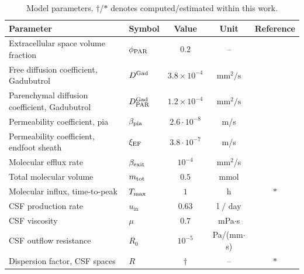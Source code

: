 \documentclass[fleqn,10pt]{wlscirep}
\begin{document}
\begin{table}
  \begin{center}
    \begin{tabular}{ll|ccc}
      \toprule
      Parameter& Symbol & Value & Unit& Reference\\
      \midrule
      Extracellular space volume fraction & $\phi_{\rm PAR}$ & 0.2 & -- & \cite{nicholson1981ion} \\
      Free diffusion coefficient, Gadubutrol & $D^{\rm Gad}$ & $3.8 \times 10^{-4}$& $\text{mm}^2/\text{s}$ & \cite{valnes2020apparent}\\
      Parenchymal diffusion coefficient, Gadubutrol & $D^{\rm Gad}_{\rm PAR}$ & $1.2 \times 10^{-4}$ & $\text{mm}^2/\text{s}$  & \cite{hornkjol2022csf} \\
      Permeability coefficient, pia & $\beta_{\rm pia}$ & $2.6 \cdot 10^{-8}$ & m/s & \cite{riseth2025twocompartment} \\
      Permeability coefficient, endfoot sheath & $\xi_{\rm EF}$ & $3.8\cdot 10^{-7}$  & m/s & \cite{koch2023estimates} \\
      Molecular efflux rate & $\beta_{\rm exit}$ & $10^{-4}$ & mm$^2$/s & \cite{hornkjol2022csf} \\
      Total molecular volume & $m_{\rm tot}$ & $0.5$ & mmol & \cite{eide2024functional} \\
      Molecular influx, time-to-peak & $T_{\rm max}$ & $1$ & h & $\ast$ \\
      CSF production rate & $u_{\mathrm{in}}$ & $0.63$  & l / day & \cite{nilsson1992circadian} \\
      CSF viscosity & $\mu$ & $0.7$ & mPa$ \cdot $s & \cite{bloomfield1998effects} \\ 
      CSF outflow resistance & $R_0$ & $10^{-5}$  & Pa/(mm$\cdot$s) & \cite{hornkjol2022csf} \\ 
      Dispersion factor, CSF spaces & $R$ & $\dagger$ & -- & $\ast$ \\
      \bottomrule
    \end{tabular}
  \end{center}
  \caption{Model parameters. $\dagger$/$\ast$ denotes computed/estimated within this work.}
  \label{tab:parameters}
\end{table}
\end{document}
